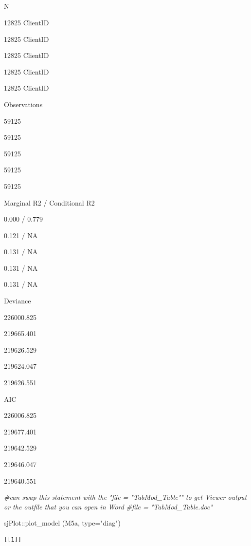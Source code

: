 \documentclass[
  english,
]{book}
\newenvironment{Shaded}{\begin{snugshade}}{\end{snugshade}}
\newcommand{\AttributeTok}[1]{\textcolor[rgb]{0.77,0.63,0.00}{#1}}
\newcommand{\CommentTok}[1]{\textcolor[rgb]{0.56,0.35,0.01}{\textit{#1}}}
\newcommand{\FunctionTok}[1]{\textcolor[rgb]{0.00,0.00,0.00}{#1}}
\newcommand{\NormalTok}[1]{#1}
\newcommand{\SpecialCharTok}[1]{\textcolor[rgb]{0.00,0.00,0.00}{#1}}
\newcommand{\StringTok}[1]{\textcolor[rgb]{0.31,0.60,0.02}{#1}}
\begin{document}
~

~

~

~

N

12825 ClientID

12825 ClientID

12825 ClientID

12825 ClientID

12825 ClientID

Observations

59125

59125

59125

59125

59125

Marginal R2 / Conditional R2

0.000 / 0.779

0.121 / NA

0.131 / NA

0.131 / NA

0.131 / NA

Deviance

226000.825

219665.401

219626.529

219624.047

219626.551

AIC

226006.825

219677.401

219642.529

219646.047

219640.551

\begin{Shaded}
\begin{Highlighting}[]
\CommentTok{\#can swap this statement with the "file = "TabMod\_Table"" to get Viewer output or the outfile that you can open in Word}
\CommentTok{\#file = "TabMod\_Table.doc"}
\end{Highlighting}
\end{Shaded}

\begin{Shaded}
\begin{Highlighting}[]
\NormalTok{sjPlot}\SpecialCharTok{::}\FunctionTok{plot\_model}\NormalTok{ (M5a, }\AttributeTok{type=}\StringTok{"diag"}\NormalTok{)}
\end{Highlighting}
\end{Shaded}

\begin{verbatim}
[[1]]
\end{verbatim}
\end{document}
